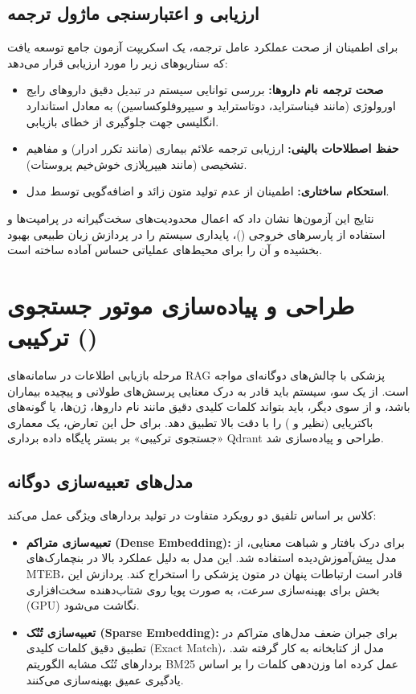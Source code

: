 \subsection{ارزیابی و اعتبارسنجی ماژول ترجمه}
برای اطمینان از صحت عملکرد عامل ترجمه، یک اسکریپت آزمون جامع توسعه یافت که سناریوهای زیر را مورد ارزیابی قرار می‌دهد:
\begin{itemize}
    \item \textbf{صحت ترجمه نام داروها:} بررسی توانایی سیستم در تبدیل دقیق داروهای رایج اورولوژی (مانند فیناستراید، دوتاستراید و سیپروفلوکساسین) به معادل استاندارد انگلیسی جهت جلوگیری از خطای بازیابی.
    \item \textbf{حفظ اصطلاحات بالینی:} ارزیابی ترجمه علائم بیماری (مانند تکرر ادرار) و مفاهیم تشخیصی (مانند هیپرپلازی خوش‌خیم پروستات).
    \item \textbf{استحکام ساختاری:} اطمینان از عدم تولید متون زائد و اضافه‌گویی توسط مدل.
\end{itemize}
نتایج این آزمون‌ها نشان داد که اعمال محدودیت‌های سخت‌گیرانه در پرامپت‌ها و استفاده از پارسرهای خروجی ()، پایداری سیستم را در پردازش زبان طبیعی بهبود بخشیده و آن را برای محیط‌های عملیاتی حساس آماده ساخته است.


\section{طراحی و پیاده‌سازی موتور جستجوی ترکیبی ()}

مرحله بازیابی اطلاعات در سامانه‌های RAG پزشکی با چالش‌های دوگانه‌ای مواجه است. از یک سو، سیستم باید قادر به درک معنایی پرسش‌های طولانی و پیچیده بیماران باشد، و از سوی دیگر، باید بتواند کلمات کلیدی دقیق مانند نام داروها، ژن‌ها، یا گونه‌های باکتریایی (نظیر  و ) را با دقت بالا تطبیق دهد. برای حل این تعارض، یک معماری «جستجوی ترکیبی» بر بستر پایگاه داده برداری Qdrant طراحی و پیاده‌سازی شد.

\subsection{مدل‌های تعبیه‌سازی دوگانه}
کلاس  بر اساس تلفیق دو رویکرد متفاوت در تولید بردارهای ویژگی عمل می‌کند:

\begin{itemize}
    \item \textbf{تعبیه‌سازی متراکم (Dense Embedding):} برای درک بافتار و شباهت معنایی، از مدل پیش‌آموزش‌دیده  استفاده شد. این مدل به دلیل عملکرد بالا در بنچمارک‌های MTEB، قادر است ارتباطات پنهان در متون پزشکی را استخراج کند. پردازش این بخش برای بهینه‌سازی سرعت، به صورت پویا روی شتاب‌دهنده سخت‌افزاری (GPU) نگاشت می‌شود.
    \item \textbf{تعبیه‌سازی تُنُک (Sparse Embedding):} برای جبران ضعف مدل‌های متراکم در تطبیق دقیق کلمات کلیدی (Exact Match)، مدل  از کتابخانه  به کار گرفته شد. بردارهای تُنُک مشابه الگوریتم BM25 عمل کرده اما وزن‌دهی کلمات را بر اساس یادگیری عمیق بهینه‌سازی می‌کنند.
\end{itemize}

